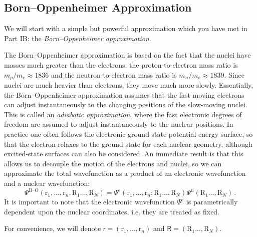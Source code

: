 \documentclass{article}
\theoremstyle{plain}\theoremheaderfont{\normalfont\itshape}\theorembodyfont{\rmfamily}\theoremseparator{.}\newtheorem*{rem}{Remark}\newtheorem*{ex}{Example}\newtheorem*{proof}{Proof}\newtheorem*{altp}{Alternative proof}
\theoremstyle{plain}\theoremheaderfont{\normalfont\bfseries}\theorembodyfont{\rmfamily}\theoremseparator{.}\newtheorem{thm}{Theorem}[section]\newtheorem{lem}[thm]{Lemma}\newtheorem{prop}[thm]{Proposition}\newtheorem*{cor}{Corollary}\newtheorem{defn}[thm]{Definition}\newtheorem{clm}[thm]{Claim}\newtheorem{clminproof}{Claim}\newtheorem{pos}{Postulate}[section]
\theoremstyle{break}\theoremheaderfont{\normalfont\itshape}\theorembodyfont{\rmfamily}\theoremseparator{.\medskip}\newtheorem*{proofskip}{Proof}\newtheorem*{exs}{Examples}\newtheorem*{rems}{Remarks}
\theoremstyle{break}\theoremheaderfont{\normalfont\bfseries}\theorembodyfont{\rmfamily}\theoremseparator{.\medskip}\newtheorem{lemskip}[thm]{Lemma}\newtheorem{defnskip}[thm]{Definition}\newtheorem{propskip}[thm]{Proposition}\newtheorem{thmskip}[thm]{Theorem}
\numberwithin{equation}{section}
\newcommand{\vb}[1]{\bm{\mathrm{#1}}}
\newcommand{\e}{^{\text{e}}}
\begin{document}
    \subsection{Born--Oppenheimer Approximation}
    We will start with a simple but powerful approximation which you have met in Part IB: the \textit{Born--Oppenheimer approximation}.

    The Born--Oppenheimer approximation is based on the fact that the nuclei have masses much greater than the electrons: the proton-to-electron mass ratio is \(m_p/m_e\approx 1836\) and the neutron-to-electron mass ratio is \(m_n/m_e\approx 1839\). Since nuclei are much heavier than electrons, they move much more slowly. Essentially, the Born--Oppenheimer approximation assumes that the fast-moving electrons can adjust instantaneously to the changing positions of the slow-moving nuclei. This is called an \textit{adiabatic approximation}, where the fast electronic degrees of freedom are assumed to adjust instantaneously to the nuclear positions. In practice one often follows the electronic ground-state potential energy surface, so that the electron relaxes to the ground state for each nuclear geometry, although excited-state surfaces can also be considered. An immediate result is that this allows us to decouple the motion of the electrons and nuclei, so we can approximate the total wavefunction as a product of an electronic wavefunction and a nuclear wavefunction:
    \begin{equation}
        \Psi^{\text{B--O}}(\vb{r}_1,\dots,\vb{r}_n,\vb{R}_1\dots,\vb{R}_N)=\Psi\e(\vb{r}_1,\dots,\vb{r}_n;\vb{R}_1\dots,\vb{R}_N)\Psi^{n}(\vb{R}_1\dots,\vb{R}_N)\,.
    \end{equation}
    It is important to note that the electronic wavefunction \(\Psi\e\) is parametrically dependent upon the nuclear coordinates, i.e. they are treated as fixed.
    
    For convenience, we will denote \(\mathsf{r}=(\vb{r}_1,\dots,\vb{r}_n)\) and \(\mathsf{R}=(\vb{R}_1\dots,\vb{R}_N)\).
\end{document}
